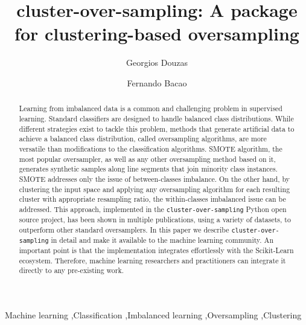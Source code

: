 \documentclass[preprint,12pt, a4paper]{elsarticle}
\begin{document}
\begin{frontmatter}

	\title{cluster-over-sampling: A package for clustering-based oversampling}

	\author{Georgios Douzas}

	\author{Fernando Bacao}

	\address{NOVA Information Management School, Universidade Nova de Lisboa}


	\begin{abstract}
	Learning from imbalanced data is a common and challenging problem in supervised learning. Standard classifiers are designed to handle balanced class distributions. While different strategies exist to tackle this problem, methods that generate artificial data to achieve a balanced class distribution, called oversampling algorithms, are more versatile than modifications to the classification algorithms. SMOTE algorithm, the most popular oversampler, as well as any other oversampling method based on it, generates synthetic samples along line segments that join minority class instances. SMOTE addresses only the issue of between-classes imbalance. On the other hand, by clustering the input space and applying any oversampling algorithm for each resulting cluster with appropriate resampling ratio, the within-classes imbalanced issue can be addressed. This approach, implemented in the \texttt{cluster-over-sampling} Python open source project, has been shown in multiple publications, using a variety of datasets, to outperform other standard oversamplers. In this paper we describe \texttt{cluster-over-sampling} in detail and make it available to the machine learning community. An important point is that the implementation integrates effortlessly with the Scikit-Learn ecosystem. Therefore, machine learning researchers and practitioners can integrate it directly to any pre-existing work.
	\end{abstract}

	\begin{keyword}
		Machine learning \sep Classification \sep Imbalanced learning \sep Oversampling \sep Clustering
	\end{keyword}

\end{frontmatter}
\end{document}
